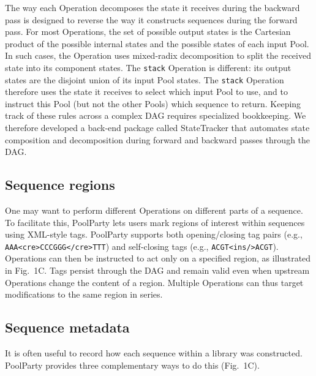 The way each Operation decomposes the state it receives during the backward pass is designed to reverse the way it constructs sequences during the forward pass. For most Operations, the set of possible output states is the Cartesian product of the possible internal states and the possible states of each input Pool. In such cases, the Operation uses mixed-radix decomposition to split the received state into its component states. The \texttt{stack} Operation is different: its output states are the disjoint union of its input Pool states. The \texttt{stack} Operation therefore uses the state it receives to select which input Pool to use, and to instruct this Pool (but not the other Pools) which sequence to return. Keeping track of these rules across a complex DAG requires specialized bookkeeping. We therefore developed a back-end package called StateTracker that automates state composition and decomposition during forward and backward passes through the DAG.

\subsection*{Sequence regions}\label{subsec:sequence-regions}

One may want to perform different Operations on different parts of a sequence. To facilitate this, PoolParty lets users mark regions of interest within sequences using XML-style tags. PoolParty supports both opening/closing tag pairs (e.g., \texttt{AAA<cre>CCCGGG</cre>TTT}) and self-closing tags (e.g., \texttt{ACGT<ins/>ACGT}). Operations can then be instructed to act only on a specified region, as illustrated in Fig.~1C. Tags persist through the DAG and remain valid even when upstream Operations change the content of a region. Multiple Operations can thus target modifications to the same region in series.

\subsection*{Sequence metadata}\label{subsec:sequence-metadata}

It is often useful to record how each sequence within a library was constructed. PoolParty provides three complementary ways to do this (Fig.~1C).

